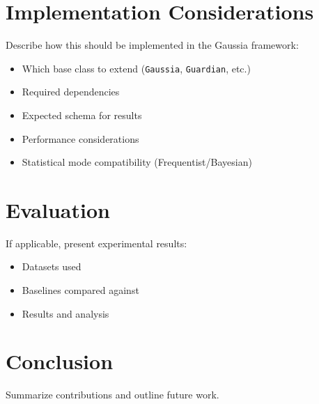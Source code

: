 \documentclass[11pt,a4paper]{article}
\begin{document}

\section{Implementation Considerations}

Describe how this should be implemented in the Gaussia framework:
\begin{itemize}
  \item Which base class to extend (\texttt{Gaussia}, \texttt{Guardian}, etc.)
  \item Required dependencies
  \item Expected schema for results
  \item Performance considerations
  \item Statistical mode compatibility (Frequentist/Bayesian)
\end{itemize}

\section{Evaluation}

If applicable, present experimental results:
\begin{itemize}
  \item Datasets used
  \item Baselines compared against
  \item Results and analysis
\end{itemize}


\section{Conclusion}

Summarize contributions and outline future work.



\end{document}
